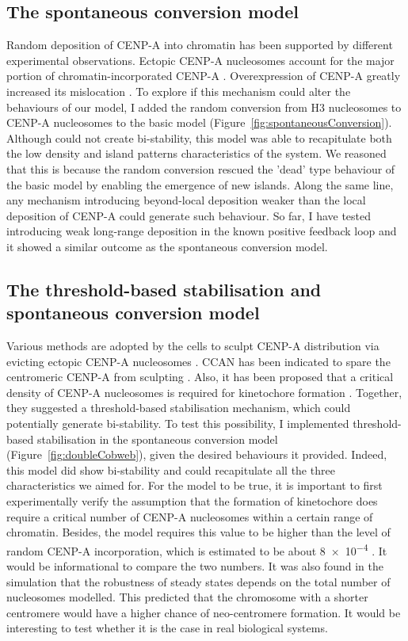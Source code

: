 \subsection{The spontaneous conversion model}

Random deposition of CENP-A into chromatin has been supported by different experimental observations. Ectopic CENP-A nucleosomes account for the major portion of chromatin-incorporated CENP-A \citep{Bodor2014}. Overexpression of CENP-A greatly increased its mislocation \citep{Gascoigne2011, VanHooser2001SpecificationCENP-A}. To explore if this mechanism could alter the behaviours of our model, I added the random conversion from H3 nucleosomes to CENP-A nucleosomes to the basic model (Figure~\ref{fig:spontaneousConversion}). Although could not create bi-stability, this model was able to recapitulate both the low density and island patterns characteristics of the system. We reasoned that this is because the random conversion rescued the 'dead' type behaviour of the basic model by enabling the emergence of new islands. Along the same line, any mechanism introducing beyond-local deposition weaker than the local deposition of CENP-A could generate such behaviour. So far, I have tested introducing weak long-range deposition in the known positive feedback loop and it showed a similar outcome as the spontaneous conversion model. 

\subsection{The threshold-based stabilisation and spontaneous conversion model}

Various methods are adopted by the cells to sculpt CENP-A distribution via evicting ectopic CENP-A nucleosomes \citep{Stirpe2022}. CCAN has been indicated to spare the centromeric CENP-A from sculpting \citep{Nechemia-Arbely2019}. Also, it has been proposed that a critical density of CENP-A nucleosomes is required for kinetochore formation \citep{Bodor2014}. Together, they suggested a threshold-based stabilisation mechanism, which could potentially generate bi-stability. To test this possibility, I implemented threshold-based stabilisation in the spontaneous conversion model (Figure~\ref{fig:doubleCobweb}), given the desired behaviours it provided. Indeed, this model did show bi-stability and could recapitulate all the three characteristics we aimed for. For the model to be true, it is important to first experimentally verify the assumption that the formation of kinetochore does require a critical number of CENP-A nucleosomes within a certain range of chromatin. Besides, the model requires this value to be higher than the level of random CENP-A incorporation, which is estimated to be about \num{8e-4} \citep{Bodor2014}. It would be informational to compare the two numbers. It was also found in the simulation that the robustness of steady states depends on the total number of nucleosomes modelled. This predicted that the chromosome with a shorter centromere would have a higher chance of neo-centromere formation. It would be interesting to test whether it is the case in real biological systems. 
